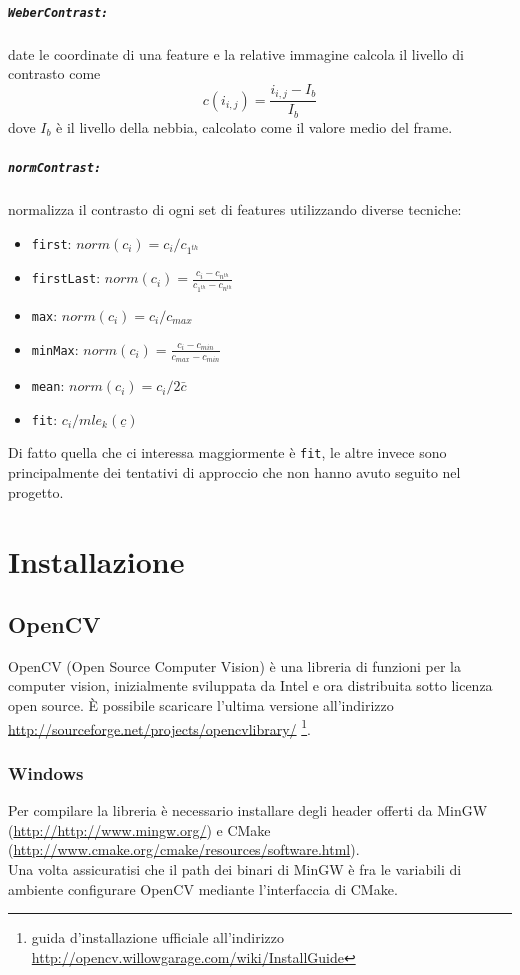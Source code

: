 \documentclass[12pt]{report}
\begin{document}
\paragraph*{\verb_WeberContrast:_} date le coordinate di una feature e la relative immagine calcola il livello di contrasto come $$c\left(i_{i,j}\right)= \frac{i_{i,j}-I_b}{I_b}$$ dove $I_b$ \`e il livello della nebbia, calcolato come il valore medio del frame.

\paragraph*{\verb_normContrast:_} normalizza il contrasto di ogni set di features utilizzando diverse tecniche:
\begin{itemize}
	\item \verb|first|: $ norm\left(c_i\right) = c_i/c_{1^{th}} $
	\item \verb|firstLast|: $ norm\left(c_i\right) = \frac{c_i-c_{n^{th}}}{c_{1^{th}} - c_{n^{th}}} $
	\item \verb|max|: $ norm\left(c_i\right) = c_i/c_{max} $
	\item \verb|minMax|: $ norm\left(c_i\right) = \frac{c_i-c_{min}}{c_{max} - c_{min}} $
	\item \verb|mean|: $ norm(c_i) = c_i/2\bar{c} $
	\item \verb|fit|: $ c_i / mle_{k}(\underline{c}) $
\end{itemize}

\noindent Di fatto quella che ci interessa maggiormente \`e \verb|fit|, le altre invece sono principalmente dei tentativi di approccio che non hanno avuto seguito nel progetto.

\chapter{Installazione}
\section{OpenCV}
OpenCV (Open Source Computer Vision) \`e una libreria di funzioni per la computer vision, inizialmente sviluppata da Intel e ora distribuita sotto licenza open source. \`E possibile scaricare l'ultima versione all'indirizzo \url{http://sourceforge.net/projects/opencvlibrary/} \footnote{guida d'installazione ufficiale all'indirizzo \url{http://opencv.willowgarage.com/wiki/InstallGuide}}.

\subsection{Windows}
Per compilare la libreria \`e necessario installare degli header offerti da MinGW (\url{http://http://www.mingw.org/}) e CMake (\url{http://www.cmake.org/cmake/resources/software.html}).\\
\noindent Una volta assicuratisi che il path dei binari di MinGW \`e fra le variabili di ambiente configurare OpenCV mediante l'interfaccia di CMake.
\end{document}
